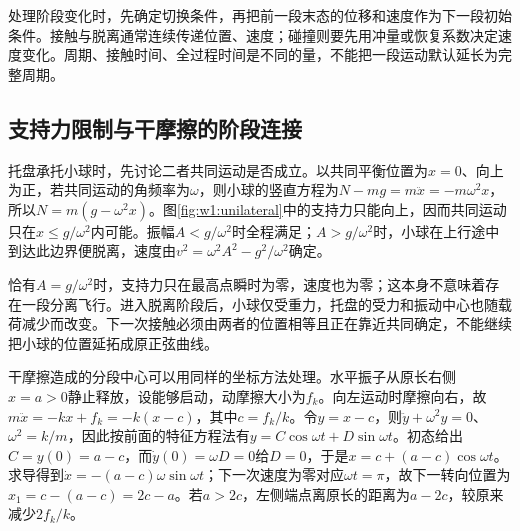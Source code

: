 处理阶段变化时，先确定切换条件，再把前一段末态的位移和速度作为下一段初始条件。接触与脱离通常连续传递位置、速度；碰撞则要先用冲量或恢复系数决定速度变化。周期、接触时间、全过程时间是不同的量，不能把一段运动默认延长为完整周期。

\subsection{支持力限制与干摩擦的阶段连接}
托盘承托小球时，先讨论二者共同运动是否成立。以共同平衡位置为$x=0$、向上为正，若共同运动的角频率为$\omega$，则小球的竖直方程为$N-mg=m\ddot x=-m\omega^2x$，所以$N=m(g-\omega^2x)$。图\ref{fig:w1:unilateral}中的支持力只能向上，因而共同运动只在$x\le g/\omega^2$内可能。振幅$A<g/\omega^2$时全程满足；$A>g/\omega^2$时，小球在上行途中到达此边界便脱离，速度由$v^2=\omega^2A^2-g^2/\omega^2$确定。

恰有$A=g/\omega^2$时，支持力只在最高点瞬时为零，速度也为零；这本身不意味着存在一段分离飞行。进入脱离阶段后，小球仅受重力，托盘的受力和振动中心也随载荷减少而改变。下一次接触必须由两者的位置相等且正在靠近共同确定，不能继续把小球的位置延拓成原正弦曲线。

干摩擦造成的分段中心可以用同样的坐标方法处理。水平振子从原长右侧$x=a>0$静止释放，设能够启动，动摩擦大小为$f_k$。向左运动时摩擦向右，故$m\ddot x=-kx+f_k=-k(x-c)$，其中$c=f_k/k$。令$y=x-c$，则$\ddot y+\omega^2y=0$、$\omega^2=k/m$，因此按前面的特征方程法有$y=C\cos\omega t+D\sin\omega t$。初态给出$C=y(0)=a-c$，而$\dot y(0)=\omega D=0$给$D=0$，于是$x=c+(a-c)\cos\omega t$。求导得到$\dot x=-(a-c)\omega\sin\omega t$；下一次速度为零对应$\omega t=\pi$，故下一转向位置为$x_1=c-(a-c)=2c-a$。若$a>2c$，左侧端点离原长的距离为$a-2c$，较原来减少$2f_k/k$。


